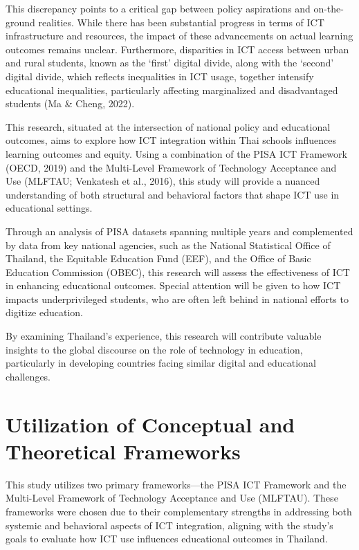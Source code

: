 \documentclass[
]{article}
\begin{document}
This discrepancy points to a critical gap between policy aspirations and
on-the-ground realities. While there has been substantial progress in
terms of ICT infrastructure and resources, the impact of these
advancements on actual learning outcomes remains unclear. Furthermore,
disparities in ICT access between urban and rural students, known as the
`first' digital divide, along with the `second' digital divide, which
reflects inequalities in ICT usage, together intensify educational
inequalities, particularly affecting marginalized and disadvantaged
students (Ma \& Cheng, 2022).

This research, situated at the intersection of national policy and
educational outcomes, aims to explore how ICT integration within Thai
schools influences learning outcomes and equity. Using a combination of
the PISA ICT Framework (OECD, 2019) and the Multi-Level Framework of
Technology Acceptance and Use (MLFTAU; Venkatesh et al., 2016), this
study will provide a nuanced understanding of both structural and
behavioral factors that shape ICT use in educational settings.

Through an analysis of PISA datasets spanning multiple years and
complemented by data from key national agencies, such as the National
Statistical Office of Thailand, the Equitable Education Fund (EEF), and
the Office of Basic Education Commission (OBEC), this research will
assess the effectiveness of ICT in enhancing educational outcomes.
Special attention will be given to how ICT impacts underprivileged
students, who are often left behind in national efforts to digitize
education.

By examining Thailand's experience, this research will contribute
valuable insights to the global discourse on the role of technology in
education, particularly in developing countries facing similar digital
and educational challenges.

\hypertarget{utilization-of-conceptual-and-theoretical-frameworks}{%
\section{Utilization of Conceptual and Theoretical
Frameworks}\label{utilization-of-conceptual-and-theoretical-frameworks}}

This study utilizes two primary frameworks---the PISA ICT Framework and
the Multi-Level Framework of Technology Acceptance and Use (MLFTAU).
These frameworks were chosen due to their complementary strengths in
addressing both systemic and behavioral aspects of ICT integration,
aligning with the study's goals to evaluate how ICT use influences
educational outcomes in Thailand.
\end{document}
